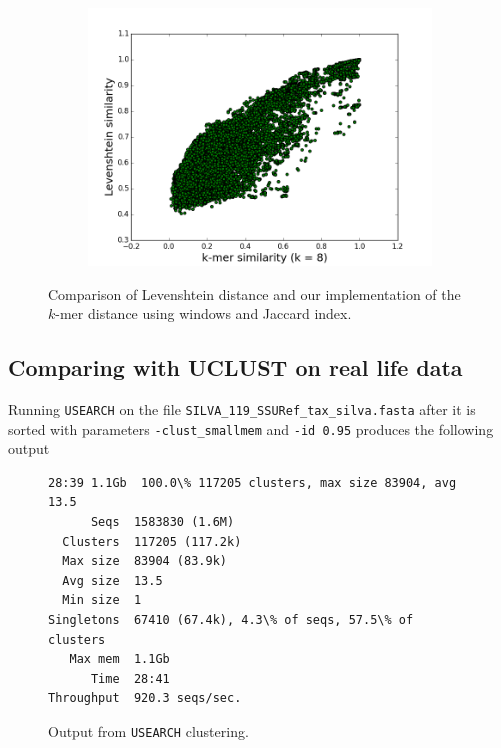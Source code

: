 \begin{figure}
  \centering
  \begin{subfigure}[b]{0.5\textwidth}
    \includegraphics[scale=0.34]{graphics/k8.png}
  \end{subfigure}
  \caption{Comparison of Levenshtein distance and our implementation of the
  $k$-mer distance using windows and Jaccard index.}
  \label{fig:Levenshtein_vs_Kmer}
\end{figure}


\subsection{Comparing with UCLUST on real life data}
Running \texttt{USEARCH} on the file
\texttt{SILVA\_119\_SSURef\_tax\_silva.fasta} after it is sorted with
parameters \texttt{-clust\_smallmem} and \texttt{-id 0.95} produces the
following output

\begin{figure}[H]
\begin{lstlisting}[style=output-style]
28:39 1.1Gb  100.0\% 117205 clusters, max size 83904, avg 13.5
      Seqs  1583830 (1.6M)
  Clusters  117205 (117.2k)
  Max size  83904 (83.9k)
  Avg size  13.5
  Min size  1
Singletons  67410 (67.4k), 4.3\% of seqs, 57.5\% of clusters
   Max mem  1.1Gb
      Time  28:41
Throughput  920.3 seqs/sec.
\end{lstlisting}
  \caption{Output from \texttt{USEARCH} clustering.}
  \label{fig:uclust_silva}
\end{figure}

